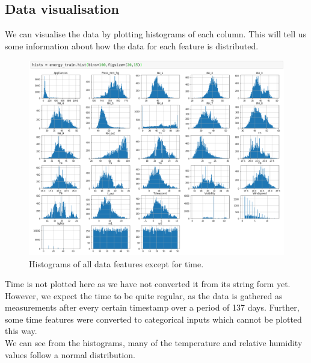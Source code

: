 \documentclass{article}
\newcommand{\n}[0]{\\[\baselineskip]}
\begin{document}
\subsection{Data visualisation}
We can visualise the data by plotting histograms of each column. This will tell us some information about how the data for each feature is distributed.

\begin{figure}[H]
\centering
\includegraphics[width=1\textwidth, keepaspectratio]{imgs/histograms.png}
\caption{Histograms of all data features except for time.}
\end{figure}
\noindent
Time is not plotted here as we have not converted it from its string form yet. However, we expect the time to be quite regular, as the data is gathered as measurements after every certain timestamp over a period of 137 days. Further, some time features were converted to categorical inputs which cannot be plotted this way.
\n
We can see from the histograms, many of the temperature and relative humidity values follow a normal distribution. 
\end{document}
